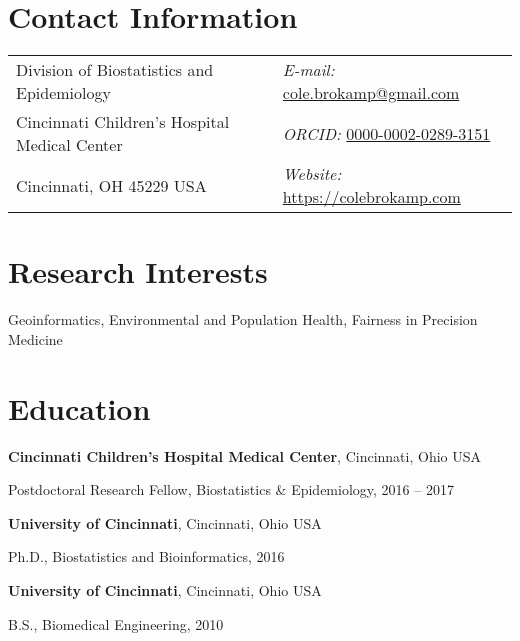\documentclass[margin,line]{res}
\newenvironment{list1}{
  \begin{list}{\ding{113}}{%
      \setlength{\itemsep}{0in}
      \setlength{\parsep}{0in} \setlength{\parskip}{0in}
      \setlength{\topsep}{0in} \setlength{\partopsep}{0in}
      \setlength{\leftmargin}{0.17in}}}{\end{list}}
\begin{document}

\begin{resume}
\section{\sc Contact Information}
\vspace{.05in}
\begin{tabular}{@{}p{3in}p{4in}}
  Division of Biostatistics and Epidemiology & {\it E-mail:}  \href{mailto:cole.brokamp@gmail.com}{cole.brokamp@gmail.com}\\
  Cincinnati Children's Hospital Medical Center & {\it ORCID:} \href{https://orcid.org/0000-0002-0289-3151}{0000-0002-0289-3151}\\
  Cincinnati, OH 45229 USA  & {\it Website:} \href{https://colebrokamp.com}{https://colebrokamp.com} \\
\end{tabular}


\section{\sc Research Interests}
Geoinformatics, Environmental and Population Health, Fairness in Precision Medicine

\section{\sc Education}

{\bf Cincinnati Children's Hospital Medical Center}, Cincinnati, Ohio USA \\
\vspace*{-.1in}
\begin{list1}
\item[]Postdoctoral Research Fellow, Biostatistics \& Epidemiology, 2016 -- 2017
\end{list1}

{\bf University of Cincinnati}, Cincinnati, Ohio USA \\
\vspace*{-.1in}
\begin{list1}
\item[]Ph.D., Biostatistics and Bioinformatics, 2016
\end{list1}

{\bf University of Cincinnati}, Cincinnati, Ohio USA\\
\vspace*{-.1in}
\begin{list1}
\item[]B.S., Biomedical Engineering, 2010
\end{list1}



\end{resume}
\end{document}
